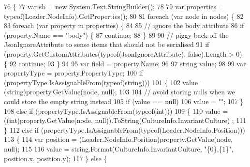 \begin{DoxyCode}
76         \{
77             var sb = \textcolor{keyword}{new} System.Text.StringBuilder();
78 
79             var properties = typeof(Loader.NodeInfo).GetProperties();
80 
81             \textcolor{keywordflow}{foreach} (var node \textcolor{keywordflow}{in} nodes) \{
82 
83                 \textcolor{keywordflow}{foreach} (var property \textcolor{keywordflow}{in} properties) \{
84 
85                     \textcolor{comment}{// ignore the body attribute}
86                     \textcolor{keywordflow}{if} (property.Name == \textcolor{stringliteral}{"body"}) \{
87                         \textcolor{keywordflow}{continue};
88                     \}
89 
90                     \textcolor{comment}{// piggy-back off the JsonIgnoreAttribute to sense items that should not be serialised}
91                     \textcolor{keywordflow}{if} (property.GetCustomAttributes(typeof(JsonIgnoreAttribute), \textcolor{keyword}{false}).Length > 0) \{
92                         \textcolor{keywordflow}{continue};
93                     \}
94 
95                     var field = property.Name;
96 
97                     \textcolor{keywordtype}{string} value;
98 
99                     var propertyType = property.PropertyType;
100                     \textcolor{keywordflow}{if} (propertyType.IsAssignableFrom(typeof(\textcolor{keywordtype}{string})))
101                     \{
102                         value = (string)property.GetValue(node, null);
103 
104                         \textcolor{comment}{// avoid storing nulls when we could store the empty string instead}
105                         \textcolor{keywordflow}{if} (value == null)
106                             value = \textcolor{stringliteral}{""};
107                     \}
108                     \textcolor{keywordflow}{else} \textcolor{keywordflow}{if} (propertyType.IsAssignableFrom(typeof(\textcolor{keywordtype}{int})))
109                     \{
110                         value = ((int)property.GetValue(node, null)).ToString(CultureInfo.InvariantCulture)
      ;
111                     \}
112                     \textcolor{keywordflow}{else} \textcolor{keywordflow}{if} (propertyType.IsAssignableFrom(typeof(Loader.NodeInfo.Position)))
113                     \{
114                         var position = (Loader.NodeInfo.Position)property.GetValue(node, null);
115 
116                         value = string.Format(CultureInfo.InvariantCulture, \textcolor{stringliteral}{"\{0\},\{1\}"}, position.x, 
      position.y);
117                     \} \textcolor{keywordflow}{else} \{

\end{DoxyCode}
